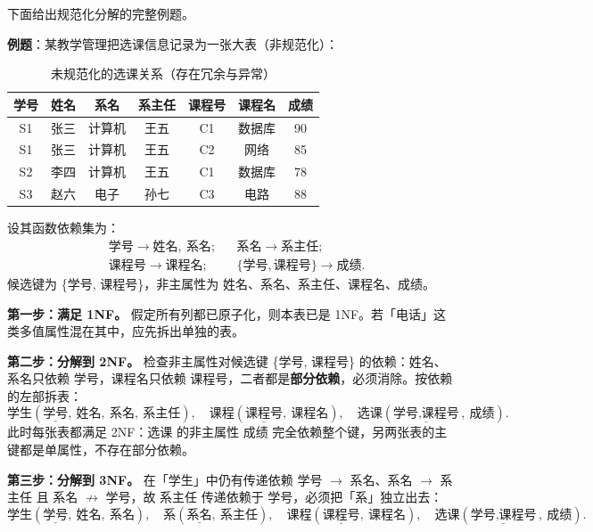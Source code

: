 下面给出规范化分解的完整例题。

\textbf{例题}：某教学管理把选课信息记录为一张大表（非规范化）：

\begin{table}[H]
\centering
\caption{未规范化的选课关系（存在冗余与异常）}
\begin{tabulary}{\textwidth}{CCCCCCC}
\toprule
学号 & 姓名 & 系名 & 系主任 & 课程号 & 课程名 & 成绩 \\
\midrule
S1 & 张三 & 计算机 & 王五 & C1 & 数据库 & 90 \\
S1 & 张三 & 计算机 & 王五 & C2 & 网络 & 85 \\
S2 & 李四 & 计算机 & 王五 & C1 & 数据库 & 78 \\
S3 & 赵六 & 电子 & 孙七 & C3 & 电路 & 88 \\
\bottomrule
\end{tabulary}
\end{table}

设其函数依赖集为：
\begin{equation}
\begin{aligned}
&\text{学号} \to \text{姓名},\ \text{系名}; & &\text{系名} \to \text{系主任};\\
&\text{课程号} \to \text{课程名}; & &\{\text{学号},\text{课程号}\} \to \text{成绩}.
\end{aligned}
\end{equation}
候选键为 \{学号, 课程号\}，非主属性为 姓名、系名、系主任、课程名、成绩。

\textbf{第一步：满足 1NF。} 假定所有列都已原子化，则本表已是 1NF。若「电话」这类多值属性混在其中，应先拆出单独的表。

\textbf{第二步：分解到 2NF。} 检查非主属性对候选键 \{学号, 课程号\} 的依赖：姓名、系名只依赖 学号，课程名只依赖 课程号，二者都是\textbf{部分依赖}，必须消除。按依赖的左部拆表：
\begin{equation}
\text{学生}(\underline{\text{学号}},\ \text{姓名},\ \text{系名},\ \text{系主任}),\quad
\text{课程}(\underline{\text{课程号}},\ \text{课程名}),\quad
\text{选课}(\underline{\text{学号},\text{课程号}},\ \text{成绩}).
\end{equation}
此时每张表都满足 2NF：选课 的非主属性 成绩 完全依赖整个键，另两张表的主键都是单属性，不存在部分依赖。

\textbf{第三步：分解到 3NF。} 在「学生」中仍有传递依赖 学号 $\to$ 系名、系名 $\to$ 系主任 且 系名 $\not\to$ 学号，故 系主任 传递依赖于 学号，必须把「系」独立出去：
\begin{equation}
\text{学生}(\underline{\text{学号}},\ \text{姓名},\ \text{系名}),\quad
\text{系}(\underline{\text{系名}},\ \text{系主任}),\quad
\text{课程}(\underline{\text{课程号}},\ \text{课程名}),\quad
\text{选课}(\underline{\text{学号},\text{课程号}},\ \text{成绩}).
\end{equation}


